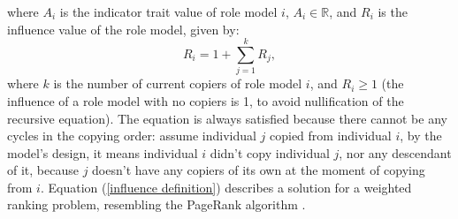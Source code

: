 \documentclass[11pt]{article}
\newcommand{\R}{\mathbb{R}}
\begin{document}
   where $A_i$ is the indicator trait value of role model $i$, $A_i \in \R$, and  $R_i$ is the influence value of the role model, given by: %
   \begin{equation} \label{influence definition}
   R_i = 1 +\sum\limits_{j=1}^{k} R_j,
   \end{equation}
   where $k$ is the number of current copiers of role model $i$, and $R_i \ge 1$ (the influence of a role model with no copiers is 1, to avoid nullification of the recursive equation).
   The equation is always satisfied because there cannot be any cycles in the copying order: 
   assume individual $j$ copied from individual $i$, by the model's design, it means individual $i$ didn't copy individual $j$, nor any descendant of it,
    because $j$ doesn't have any copiers of its own at the moment of copying from $i$.
   Equation (\ref{influence definition}) describes a solution for a weighted ranking problem, resembling the PageRank algorithm \citep{pageRank}.\\
\end{document}
